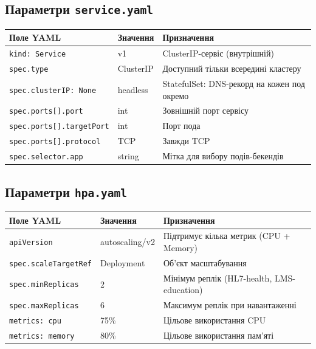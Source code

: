 \documentclass[12pt,a4paper]{article}
\begin{document}
\subsection{Параметри \texttt{service.yaml}}

\begin{longtable}{L{5.0cm} L{2.5cm} L{6.5cm}}
\toprule
{}
\color{primary}\textbf{Поле YAML} & \color{primary}\textbf{Значення} & \color{primary}\textbf{Призначення} \\
\midrule\endhead\bottomrule\endfoot
\texttt{kind: Service}           & v1          & ClusterIP-сервіс (внутрішній) \\[2pt]
\texttt{spec.type} & ClusterIP  & Доступний тільки всередині кластеру \\[2pt]
\texttt{spec.clusterIP: None}    & headless    & StatefulSet: DNS-рекорд на кожен под окремо \\[2pt]
\texttt{spec.ports[].port} & int & Зовнішній порт сервісу \\[2pt]
\texttt{spec.ports[].targetPort} & int         & Порт пода \\[2pt]
\texttt{spec.ports[].protocol} & TCP & Завжди TCP \\[2pt]
\texttt{spec.selector.app}       & string      & Мітка для вибору подів-бекендів \\[2pt]
\end{longtable}

\newpage
\subsection{Параметри \texttt{hpa.yaml}}

\begin{longtable}{L{5.0cm} L{2.5cm} L{6.5cm}}
\toprule
{}
\color{primary}\textbf{Поле YAML} & \color{primary}\textbf{Значення} & \color{primary}\textbf{Призначення} \\
\midrule\endhead\bottomrule\endfoot
\texttt{apiVersion} & autoscaling/v2 & Підтримує кілька метрик (CPU + Memory) \\[2pt]
\texttt{spec.scaleTargetRef} & Deployment & Об'єкт масштабування \\[2pt]
\texttt{spec.minReplicas}     & 2           & Мінімум реплік (HL7-health, LMS-education) \\[2pt]
\texttt{spec.maxReplicas} & 6 & Максимум реплік при навантаженні \\[2pt]
\texttt{metrics: cpu}         & 75\%        & Цільове використання CPU \\[2pt]
\texttt{metrics: memory}  & 80\% & Цільове використання пам'яті \\[2pt]
\end{longtable}
\end{document}
